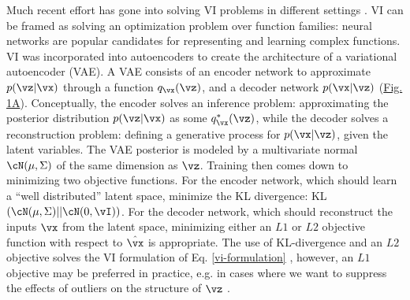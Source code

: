 Much recent effort has gone into solving VI problems in different settings \citep{Zhang2019, Ingraham2017, Bouchard-Cote2010}. VI can be framed as solving an optimization problem over function families: neural networks are popular candidates for representing and learning complex functions. VI was incorporated into autoencoders \citep{Kingma2014} to create the architecture of a variational autoencoder (VAE). A VAE consists of an encoder network to approximate $p(\vz|\vx)$ through a function $q_\vx(\vz)$, and a decoder network $p(\vx|\vz)$ (\hyperref[fig:fig2]{Fig. 1A}). Conceptually, the encoder solves an inference problem: approximating the posterior distribution $p(\vz|\vx)$ as some $q^*_\vx(\vz)$, while the decoder solves a reconstruction problem: defining a generative process for $p(\vx|\vz)$, given the latent variables.
The VAE posterior is modeled by a multivariate normal $\cN(\mathbf{\mu},\Sigma)$ of the same dimension as $\vz$. Training then comes down to minimizing two objective functions. For the encoder network, which should learn a ``well distributed'' latent space, minimize the KL divergence: KL$(\cN(\mathbf{\mu},\Sigma) || \cN(0,\vI)) $. For the decoder network, which should reconstruct the inputs $\vx$ from the latent space, minimizing either an $L1$ or $L2$ objective function with respect to $\hat{\vx}$ is appropriate. The use of KL-divergence and an $L2$ objective solves the VI formulation of Eq. \ref{vi-formulation} \citep{Kingma2014}, however, an $L1$ objective may be preferred in practice, e.g. in cases where we want to suppress the effects of outliers on the structure of $\vz$ \citep{botchkarev2018performance}.





